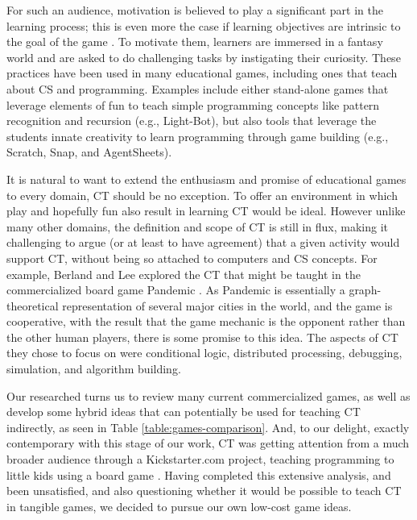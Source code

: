 \documentclass{acm_proc_article-sp}
\begin{document}
For such an audience, motivation is believed to play a significant part in the learning process; this is even more the case if learning objectives are intrinsic to the goal of the game \cite{malone1987making}.
To motivate them, learners are immersed in a fantasy world and are asked to do challenging tasks by instigating their curiosity.
These practices have been used in many educational games, including ones that teach about CS and programming.
Examples include either stand-alone games that leverage elements of fun to teach simple programming concepts like pattern recognition and recursion (e.g., Light-Bot), but also tools that leverage the students innate creativity to learn programming through game building (e.g., Scratch, Snap, and AgentSheets).

It is natural to want to extend the enthusiasm and promise of educational games to every domain, CT should be no exception.
To offer an environment in which play and hopefully fun also result in learning CT would be ideal.
However unlike many other domains, the definition and scope of CT is still in flux, making it challenging to argue (or at least to have agreement) that a given activity would support CT, without being so attached to computers and CS concepts.
For example, Berland and Lee explored the CT that might be taught in the commercialized board game Pandemic \cite{berland2011collaborative}.
As Pandemic is essentially a graph-theoretical representation of several major cities in the world, and the game is cooperative, with the result that the game mechanic is the opponent rather than the other human players, there is some promise to this idea.
The aspects of CT they chose to focus on were conditional logic, distributed processing, debugging, simulation, and algorithm building. 

Our researched turns us to review many current commercialized games, as well as develop some hybrid ideas that can potentially be used for teaching CT indirectly, as seen in Table \ref{table:games-comparison}.
And, to our delight, exactly contemporary with this stage of our work, CT was getting attention from a much broader audience through a Kickstarter.com project, teaching programming to little kids using a board game \cite{robotturtles}.
Having completed this extensive analysis, and been unsatisfied, and also questioning whether it would be possible to teach CT in tangible games, we decided to pursue our own low-cost game ideas.
\end{document}
